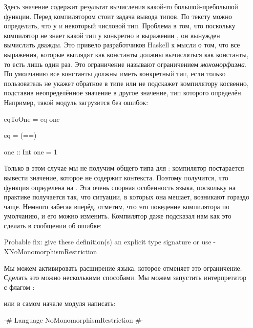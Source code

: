 Здесь значение  содержит результат вычисления какой-то
большой-пребольшой функции. Перед компилятором стоит задача вывода
типов. По тексту можно определить, что у  и  некоторый
числовой тип. Проблема в том, что поскольку компилятор не знает какой
тип у  конкретно в выражении , он вынужден вычислить
 дважды. Это привело разработчиков Haskell к мысли о том, что все
выражения, которые выглядят как константы должны вычисляться как
константы, то есть лишь один раз. Это ограничение называют ограничением
\emph{мономорфизма}. По умолчанию все константы должны иметь конкретный
тип, если только пользователь не укажет обратное в типе или не подскажет
компилятору косвенно, подставив неопределённое значение в другое
значение, тип которого определён. Например, такой модуль загрузится без
ошибок:


\begin{code}
eqToOne = eq one

eq = (==)

one :: Int
one = 1
\end{code}

Только в этом случае мы не получим общего типа для : компилятор
постарается вывести значение, которое не содержит контекста. Поэтому
получится, что функция  определена на . Эта очень спорная
особенность языка, поскольку на практике получается так, что ситуации, в
которых она мешает, возникают гораздо чаще. Немного забегая вперёд,
отметим, что это поведение компилятора по умолчанию, и его можно
изменить. Компилятор даже подсказал нам как это сделать в сообщении об
ошибке:


\begin{code}
Probable fix: give these definition(s) an explicit type signature
         or use -XNoMonomorphismRestriction
\end{code}

Мы можем активировать расширение языка, которое отменяет это
ограничение. Сделать это можно несколькими способами. Мы можем запустить
интерпретатор с флагом :



\noindent 

или в самом начале модуля написать:


\begin{code}
{-# Language NoMonomorphismRestriction #-}
\end{code}

